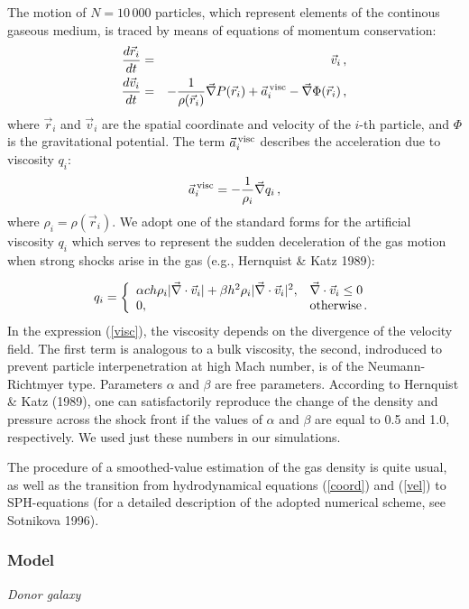 The motion of $N = 10\,000$ particles, which represent elements of the 
continous gaseous medium, is traced by means of equations of momentum 
conservation:
\begin{eqnarray}
\frac{d \vec{r}_i}{d t} &=& \vec{v}_i \, ,
\label{coord} \\
\frac{d \vec{v}_i}{d t} &=& - \frac{1}{\rho(\vec{r}_i)} \vec{\nabla} P(\vec{r}_i) + 
\vec{a}^{\rm \, visc}_i - \vec{\nabla} \Phi(\vec{r}_i) \, ,
\label{vel} 
\end{eqnarray}
where $\vec{r}_i$ and $\vec{v}_i$ are the spatial coordinate and velocity 
of the $i$-th particle, and $\Phi$ is the gravitational potential. The term 
$\vec{a}^{\rm \, visc}_i$ describes the acceleration due to viscosity 
$q_i$:
$$
\vec{a}^{\rm \, visc}_i = - \frac{1}{\rho_i} \vec{\nabla} q_i \, ,
$$
where $\rho_i = \rho(\vec{r}_i)$. We adopt one of the standard forms for the 
artificial viscosity $q_i$ which serves to represent the sudden 
deceleration of the gas motion when strong shocks arise in the gas 
(e.g., Hernquist \& Katz 1989):

\begin{equation}
q_i = \left\{ 
\begin{array}{ll}
\alpha c h \rho_i |\vec{\nabla} \cdot \vec{v}_i| + 
\beta h^2 \rho_i |\vec{\nabla} \cdot \vec{v}_i|^2  
, & \vec{\nabla} \cdot \vec{v}_i \leq 0 \\
0 ,                                & {\rm otherwise} \, . 
\end{array}
\right.
\label{visc}
\end{equation}
In the expression (\ref{visc}), the viscosity depends on the divergence of 
the velocity field. The first term is analogous to a bulk viscosity, the 
second, indroduced to prevent particle interpenetration at high 
Mach number, is of the Neumann-Richtmyer type. Parameters $\alpha$ and 
$\beta$ are free parameters. According to Hernquist \& Katz (1989), one 
can satisfactorily reproduce the change of the density and pressure across 
the shock front if the values of $\alpha$ and $\beta$ are equal to 0.5 
and 1.0, respectively. We used just these numbers in our simulations.

The procedure of a smoothed-value estimation of the gas density is 
quite usual, as well as the transition from hydrodynamical equations 
(\ref{coord}) and (\ref{vel}) to SPH-equations (for a detailed 
description of the adopted numerical scheme, see Sotnikova 1996).  

\subsubsection{Model} 
{\it Donor galaxy}

